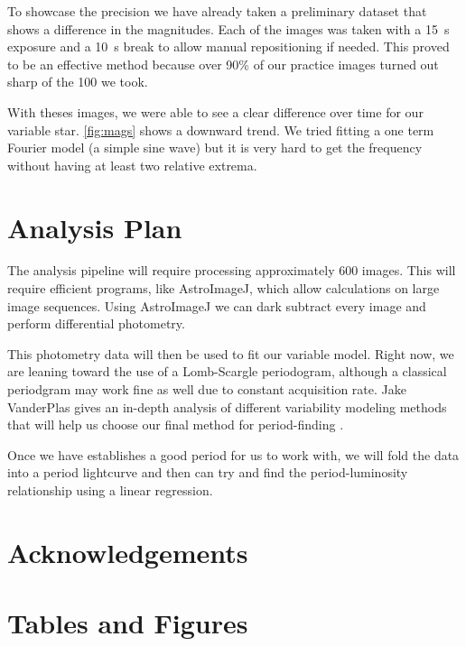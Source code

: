 \documentclass[]{article}
\begin{document}
	To showcase the precision we have already taken a preliminary dataset that shows a difference in the magnitudes. Each of the images was taken with a \SI{15}{\second} exposure and a \SI{10}{\second} break to allow manual repositioning if needed. This proved to be an effective method because over 90\% of our practice images turned out sharp of the 100 we took.
	
	With theses images, we were able to see a clear difference over time for our variable star. \autoref{fig:mags} shows a downward trend. We tried fitting a one term Fourier model (a simple sine wave) but it is very hard to get the frequency without having at least two relative extrema.

	
\section{Analysis Plan}

	The analysis pipeline will require processing approximately 600 images. This will require efficient programs, like AstroImageJ, which allow calculations on large image sequences. Using AstroImageJ we can dark subtract every image and perform differential photometry. 
	
	This photometry data will then be used to fit our variable model. Right now, we are leaning toward the use of a Lomb-Scargle periodogram, although a classical periodgram may work fine as well due to constant acquisition rate. Jake VanderPlas gives an in-depth analysis of different variability modeling methods that will help us choose our final method for period-finding \cite{2017arXiv170309824V}.
	
	Once we have establishes a good period for us to work with, we will fold the data into a period lightcurve and then can try and find the period-luminosity relationship using a linear regression.


%
%

\section*{Acknowledgements}


\appendix
\section{Tables and Figures}
\end{document}
